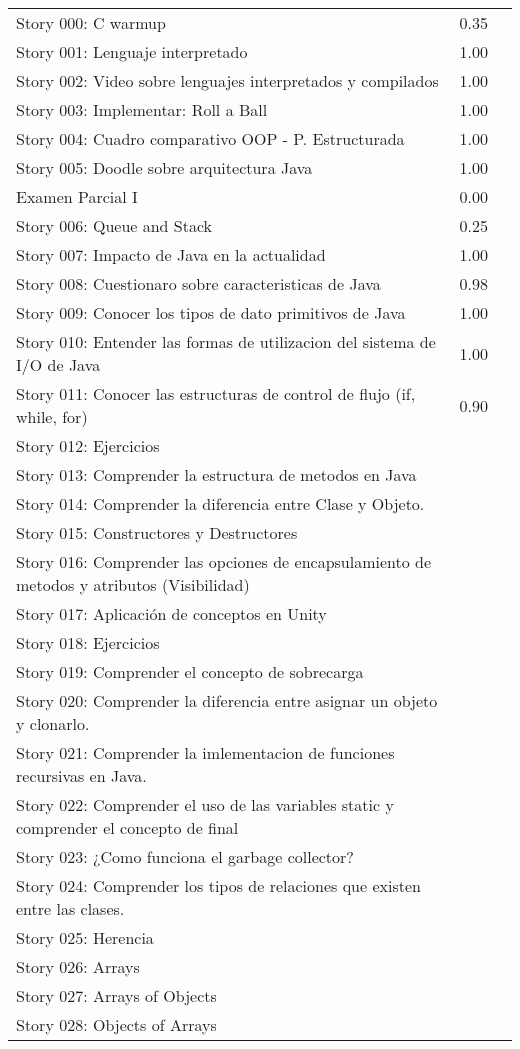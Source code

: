 
\begin{center}
\begin{tabular}{ | p{5cm} | p{5cm} | p{5cm} | }
 \hline
 Story 000: C warmup & 0.35 & \\ 
 Story 001: Lenguaje interpretado &  1.00 & \\ 
Story 002: Video sobre lenguajes interpretados y compilados & 1.00 & \\ 
Story 003: Implementar: Roll a Ball & 1.00 & \\ 
Story 004: Cuadro comparativo OOP - P. Estructurada & 1.00 & \\ 
Story 005: Doodle sobre arquitectura Java & 1.00 & \\ 
Examen Parcial I & 0.00 & \\ 
Story 006: Queue and Stack & 0.25 & \\ 
Story 007: Impacto de Java en la actualidad & 1.00 & \\ 
Story 008: Cuestionaro sobre caracteristicas de Java & 0.98 & \\ 
Story 009: Conocer los tipos de dato primitivos de Java & 1.00  & \\ 
Story 010: Entender las formas de utilizacion del sistema de I/O de Java & 1.00  &  \\ 
Story 011: Conocer las estructuras de control de flujo (if, while, for) & 0.90  & \\ 
Story 012: Ejercicios &  & \\ 
Story 013: Comprender la estructura de metodos en Java &   & \\ 
Story 014: Comprender la diferencia entre Clase y Objeto. &   & \\ 
Story 015: Constructores y Destructores &   & \\ 
Story 016: Comprender las opciones de encapsulamiento de metodos y atributos (Visibilidad) &  &  \\ 
Story 017: Aplicación de conceptos en Unity &   & \\ 
Story 018: Ejercicios &   & \\ 
Story 019: Comprender el concepto de sobrecarga &   & \\ 
Story 020: Comprender la diferencia entre asignar un objeto y clonarlo. &  &  \\ 
Story 021: Comprender la imlementacion de funciones recursivas en Java. &   & \\ 
Story 022: Comprender el uso de las variables static y comprender el concepto de final &   & \\ 
Story 023: ¿Como funciona el garbage collector? &   & \\ 
Story 024: Comprender los tipos de relaciones que existen entre las clases. &  &  \\ 
Story 025: Herencia &   & \\ 
Story 026: Arrays &   & \\ 
Story 027: Arrays of Objects &  &  \\ 
Story 028: Objects of Arrays &  & \\ 
\hline 
\end{tabular}
\end{center}
